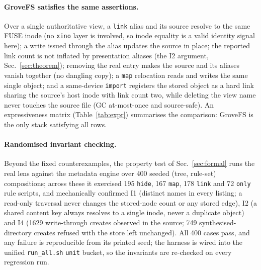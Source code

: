 \documentclass[numberedsection,acmtos]{acmart}
\begin{document}
\paragraph{GroveFS satisfies the same assertions.}
Over a single authoritative view, a \texttt{link} alias and its source resolve to
the same FUSE inode (no \texttt{xino} layer is involved, so inode equality is a
valid identity signal here); a write issued through the alias updates the source
in place; the reported link count is not inflated by presentation aliases
(the I2 argument, Sec.~\ref{sec:theorem}); removing the real entry makes the source and its
aliases vanish together (no dangling copy); a \texttt{map} relocation reads and
writes the same single object; and a same-device \texttt{import} registers the
stored object as a hard link sharing the source's host inode with link count
two, while deleting the view name never touches the source file (GC at-most-once
and source-safe). An expressiveness matrix (Table~\ref{tab:expr}) summarises the
comparison: GroveFS is the only stack satisfying all rows.

\paragraph{Randomised invariant checking.}
Beyond the fixed counterexamples, the property test of Sec.~\ref{sec:formal}
runs the real lens against the metadata engine over 400 seeded (tree,
rule-set) compositions; across these it exercised 195 \texttt{hide}, 167
\texttt{map}, 178 \texttt{link} and 72 \texttt{only} rule scripts, and
mechanically confirmed I1 (distinct names in every listing; a read-only
traversal never changes the stored-node count or any stored edge), I2 (a shared
content key always resolves to a single inode, never a duplicate object) and I4
(1629 write-through creates observed in the source; 749 synthesised-directory
creates refused with the store left unchanged). All 400 cases pass, and any
failure is reproducible from its printed seed; the harness is wired into the
unified \texttt{run\_all.sh} \texttt{unit} bucket, so the invariants are
re-checked on every regression run.
\end{document}
